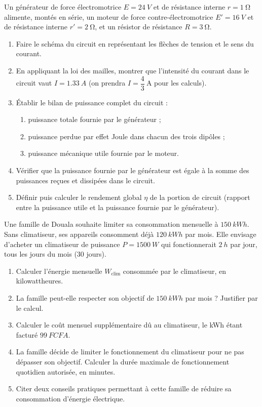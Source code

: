 \documentclass[11pt]{article}
\newcounter{popsec}
\newcounter{popsub}
\newcommand{\courssub}[1]{%
  \stepcounter{popsub}%
  \par\vspace{9pt}\noindent{\popxbold\fontsize{11.5}{13}\selectfont\color{popink}{\color{poporange}\thepopsec.\thepopsub}\hspace{6pt}#1}\par\nopagebreak\vspace{4pt}
}
\begin{document}
\courssub{Je me prépare au Probatoire}

\begin{exercice}
Un générateur de force électromotrice $E = \SI{24}{V}$ et de résistance interne $r = \SI{1}{\ohm}$ alimente, montés en série, un moteur de force contre-électromotrice $E' = \SI{16}{V}$ et de résistance interne $r' = \SI{2}{\ohm}$, et un résistor de résistance $R = \SI{3}{\ohm}$.
\begin{enumerate}
\item Faire le schéma du circuit en représentant les flèches de tension et le sens du courant.
\item En appliquant la loi des mailles, montrer que l'intensité du courant dans le circuit vaut $I = \SI{1,33}{A}$ (on prendra $I = \dfrac{4}{3}\ \text{A}$ pour les calculs).
\item Établir le bilan de puissance complet du circuit :
\begin{enumerate}
\item puissance totale fournie par le générateur ;
\item puissance perdue par effet Joule dans chacun des trois dipôles ;
\item puissance mécanique utile fournie par le moteur.
\end{enumerate}
\item Vérifier que la puissance fournie par le générateur est égale à la somme des puissances reçues et dissipées dans le circuit.
\item Définir puis calculer le rendement global $\eta$ de la portion de circuit (rapport entre la puissance utile et la puissance fournie par le générateur).
\end{enumerate}
\end{exercice}

\begin{exercice}
Une famille de Douala souhaite limiter sa consommation mensuelle à $\SI{150}{kWh}$. Sans climatiseur, ses appareils consomment déjà $\SI{120}{kWh}$ par mois. Elle envisage d'acheter un climatiseur de puissance $P = \SI{1500}{W}$ qui fonctionnerait $\SI{2}{h}$ par jour, tous les jours du mois (30 jours).
\begin{enumerate}
\item Calculer l'énergie mensuelle $W_{\text{clim}}$ consommée par le climatiseur, en kilowattheures.
\item La famille peut-elle respecter son objectif de $\SI{150}{kWh}$ par mois ? Justifier par le calcul.
\item Calculer le coût mensuel supplémentaire dû au climatiseur, le kWh étant facturé $\SI{99}{FCFA}$.
\item La famille décide de limiter le fonctionnement du climatiseur pour ne pas dépasser son objectif. Calculer la durée maximale de fonctionnement quotidien autorisée, en minutes.
\item Citer deux conseils pratiques permettant à cette famille de réduire sa consommation d'énergie électrique.
\end{enumerate}
\end{exercice}
\end{document}
